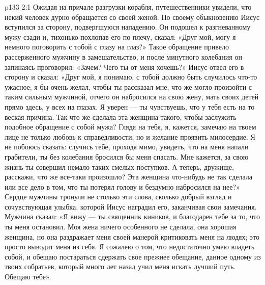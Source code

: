 \vs p133 2:1 Ожидая на причале разгрузки корабля, путешественники увидели, что некий человек дурно обращается со своей женой. По своему обыкновению Иисус вступился за сторону, подвергшуюся нападению. Он подошел к разгневанному мужу сзади и, тихонько похлопав его по плечу, сказал: «Друг мой, могу я немного поговорить с тобой с глазу на глаз?» Такое обращение привело рассерженного мужчину в замешательство, и после минутного колебания он запинаясь проговорил: «Зачем? Чего ты от меня хочешь?» Иисус отвел его в сторону и сказал: «Друг мой, я понимаю, с тобой должно быть случилось что\hyp{}то ужасное; я бы очень желал, чтобы ты рассказал мне, что же могло произойти с таким сильным мужчиной, отчего он набросился на свою жену, мать своих детей прямо здесь, у всех на глазах. Я уверен --- ты чувствуешь, что у тебя есть на то веская причина. Так что же сделала эта женщина такого, чтобы заслужить подобное обращение с собой мужа? Глядя на тебя, я, кажется, замечаю на твоем лице не только любовь к справедливости, но и желание проявить милосердие. Я не побоюсь сказать: случись тебе, проходя мимо, увидеть, что на меня напали грабители, ты без колебания бросился бы меня спасать. Мне кажется, за свою жизнь ты совершил немало таких смелых поступков. А теперь, дружище, расскажи, что же все\hyp{}таки произошло? Эта женщина что\hyp{}нибудь не так сделала или все дело в том, что ты потерял голову и бездумно набросился на нее?» Сердце мужчины тронули не столько эти слова, сколько добрый взгляд и сочувствующая улыбка, которой Иисус наградил его, заканчивая свои замечания. Мужчина сказал: «Я вижу --- ты священник киников, и благодарен тебе за то, что ты меня остановил. Моя жена ничего особенного не сделала, она хорошая женщина, но она раздражает меня своей манерой критиковать меня на людях; это просто выводит меня из себя. Я сожалею о том, что недостаточно умею владеть собой, и обещаю постараться сдержать свое прежнее обещание, данное одному из твоих собратьев, который много лет назад учил меня искать лучший путь. Обещаю тебе».
